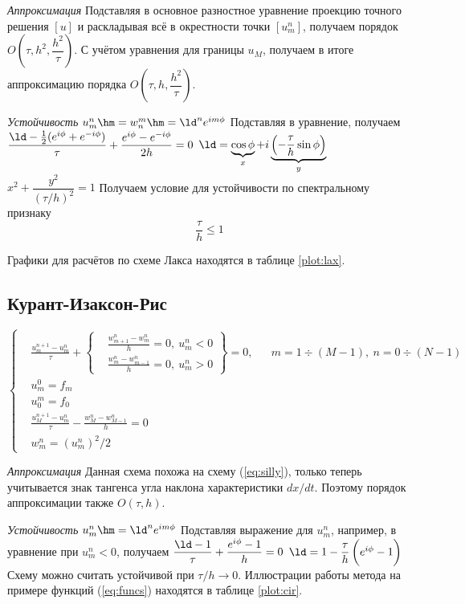 \documentclass[a4paper,12pt]{article}
\begin{document}
  \jp
  \emph{Аппроксимация}
  \jp
  Подставляя в основное разностное уравнение проекцию точного решения $[u]$ и раскладывая всё в окрестности точки $[u_m^n]$, получаем порядок $O\left(\tau, h^2, \dfrac{h^2}{\tau}\right)$.
  С учётом уравнения для границы $u_M$, получаем в итоге аппроксимацию порядка $O\left(\tau, h, \dfrac{h^2}{\tau}\right)$.
  
  \jp
  \emph{Устойчивость}
  \jp
  $u_m^n \hm= w_n^m \hm= \ld^n e^{im\phi}$\jp
  Подставляя в уравнение, получаем\jp
  $\dfrac{\ld - \frac{1}{2} (e^{i\phi} + e^{-i\phi})}{\tau} + \dfrac{e^{i\phi} - e^{-i\phi}}{2h} = 0$\jp
  $\ld = \underbrace{\cos{\phi}}_{x} + i \underbrace{\left(-\dfrac{\tau}{h} \sin{\phi}\right)}_{y}$\jp
  $x^2 + \dfrac{y^2}{(\tau / h)^2} = 1$\jp
  Получаем условие для устойчивости по спектральному признаку
  \[
    \frac{\tau}{h} \leq 1
  \]
  
  \noi
  Графики для расчётов по схеме Лакса находятся в таблице \ref{plot:lax}.
  \newpage

\subsection{Курант-Изаксон-Рис}
\label{sec:cir}
  \begin{equation}
    \left\{
    \begin{aligned}
      &\frac{u_m^{n+1} - u_m^n}{\tau} +
        \left\{
        \begin{aligned}
          &\frac{w_{m+1}^n - w_m^n}{h} = 0,\ u_m^n < 0\\
          &\frac{w_{m}^n - w_{m-1}^n}{h} = 0,\ u_m^n > 0
        \end{aligned}
        \right\} = 0,
        & &m = 1 \div (M-1),\ n = 0 \div (N-1)\\
      &u_m^0 = f_m & &{}\\
      &u_0^m = f_0 & &{}\\
      &\frac{u_M^{n+1} - u_m^n}{\tau} - \frac{w_M^n - w_{M-1}^n}{h} = 0 & &{}\\
      &w_m^n = (u_m^n)^2 \Big/ 2 & &{}
    \end{aligned}
    \right.
    \label{eq:cir}
  \end{equation}
  
  \jp
  \emph{Аппроксимация}
  \jp
  Данная схема похожа на схему (\ref{eq:silly}), только теперь учитывается знак тангенса угла наклона характеристики $dx / dt$.
  Поэтому порядок аппроксимации также $O(\tau, h)$.
  
  \jp
  \emph{Устойчивость}
  \jp
  $u_m^n \hm= \ld^n e^{im\phi}$\jp
  Подставляя выражение для $u_m^n$, например, в уравнение при $u_m^n < 0$, получаем\jp
  $\dfrac{\ld - 1}{\tau} + \dfrac{e^{i\phi} - 1}{h} = 0$\jp
  $\ld = 1 - \dfrac{\tau}{h} \left(\vphantom{\dfrac{1}{1}}e^{i\phi} - 1\right)$\jp
  Схему можно считать устойчивой при $\tau \Big/ h \to 0$.
  \jp
  Иллюстрации работы метода на примере функций (\ref{eq:funcs}) находятся в таблице \ref{plot:cir}.
  \newpage
\end{document}
